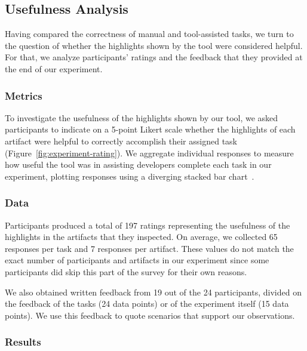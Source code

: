 

\subsection{Usefulness Analysis}
\label{cp6:usefulness}



Having compared the correctness of manual and tool-assisted tasks,
we turn to the question of 
whether the highlights shown by the tool were considered helpful. 
For that, we analyze participants' ratings and the feedback that they 
provided at the end of our experiment.


\subsubsection{Metrics}

To investigate the usefulness of the highlights shown by our tool, we asked participants to indicate on a 5-point Likert scale whether the highlights
of each artifact were helpful to correctly accomplish their assigned task (Figure~\ref{fig:experiment-rating}). We aggregate individual responses to measure how useful the tool was in assisting developers complete each task in our experiment, plotting responses using a diverging stacked bar chart~\cite{spence2001info-viz}.



\subsubsection{Data}


Participants produced a total of 197 ratings representing the usefulness of the highlights in the artifacts that they inspected.
On average, we collected 65 responses per task and 7 responses per artifact.  
These values do not match the exact number of participants and artifacts in our experiment since some participants did skip this part of 
the survey for their own reasons.


We also obtained written feedback from 19 out of the 24 participants, divided on the feedback of the tasks (24 data points)
or of the experiment itself (15 data points). We use this feedback to quote scenarios
that support our observations.



\subsubsection{Results}


